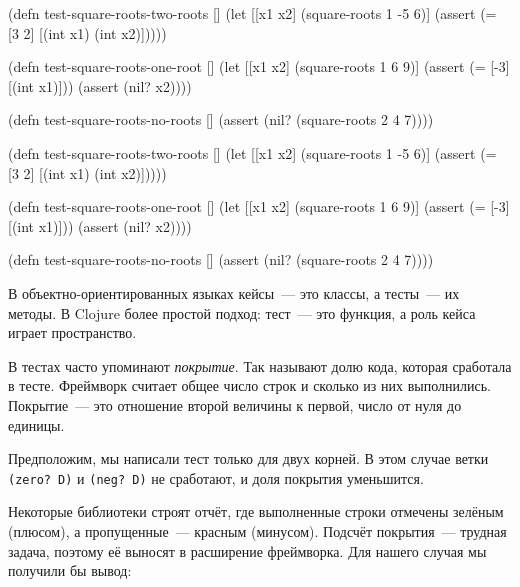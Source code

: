 \ifx\DEVICETYPE\MOBILE

\begin{english}
  \begin{clojure}
(defn test-square-roots-two-roots []
  (let [[x1 x2] (square-roots 1 -5 6)]
    (assert
      (= [3 2]
         [(int x1) (int x2)]))))

(defn test-square-roots-one-root []
  (let [[x1 x2] (square-roots 1 6 9)]
    (assert (= [-3] [(int x1)]))
    (assert (nil? x2))))

(defn test-square-roots-no-roots []
  (assert (nil? (square-roots 2 4 7))))
  \end{clojure}
\end{english}

\else

\begin{english}
  \begin{clojure}
(defn test-square-roots-two-roots []
  (let [[x1 x2] (square-roots 1 -5 6)]
    (assert (= [3 2] [(int x1) (int x2)]))))

(defn test-square-roots-one-root []
  (let [[x1 x2] (square-roots 1 6 9)]
    (assert (= [-3] [(int x1)]))
    (assert (nil? x2))))

(defn test-square-roots-no-roots []
  (assert (nil? (square-roots 2 4 7))))
  \end{clojure}
\end{english}

\fi

В объектно-ориентированных языках кейсы~--- это классы, а тесты~--- их методы. В
Clojure более простой подход: тест~--- это функция, а роль кейса играет
пространство.


В тестах часто упоминают \emph{покрытие}. Так называют долю кода, которая
сработала в тесте. Фреймворк считает общее число строк и сколько из них
выполнились. Покрытие~--- это отношение второй величины к первой, число от нуля
до единицы.

Предположим, мы написали тест только для двух корней. В этом случае ветки
\verb|(zero? D)| и \verb|(neg? D)| не сработают, и доля покрытия уменьшится.

Некоторые библиотеки строят отчёт, где выполненные строки отмечены зелёным
(плюсом), а пропущенные~--- красным (минусом). Подсчёт покрытия~--- трудная
задача, поэтому её выносят в расширение фреймворка. Для нашего случая мы
получили бы вывод:

\ifx\DEVICETYPE\MOBILE

